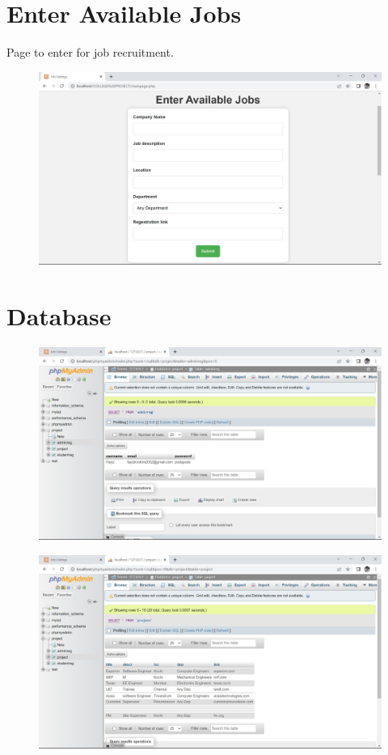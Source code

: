 \documentclass[a4paper,11pt]{report}
\begin{document}
\section{Enter Available Jobs}
Page to enter for job recruitment.
\begin{figure}[h]
	\centering
	\hspace{21pt}
	\includegraphics[width=.70\linewidth]{job0.jpeg}
	\label{fig:job0.jpeg}
\end{figure}

\section{Database}

\begin{figure}[h]
	\centering
	\hspace{21pt}
	\includegraphics[width=.70\linewidth]{job7.jpeg}
	\label{fig:job7.jpeg}
\end{figure}
\begin{figure}[h]
	\centering
	\hspace{21pt}
	\includegraphics[width=.70\linewidth]{job8.jpeg}
	\label{fig:job8.jpeg}
\end{figure}
\end{document}
